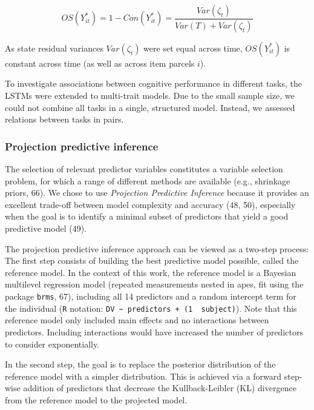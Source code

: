 \documentclass[
  man,floatsintext]{apa6}
\begin{document}
\begin{equation}
OS(Y^*_{it})=1-Con(Y^*_{it}) = \frac{Var(\zeta_t)}{Var(T)+Var(\zeta_t)}
\end{equation}

As state residual variances \(Var(\zeta_t)\) were set equal across time, \(OS(Y^*_{it})\) is constant across time (as well as across item parcels \(i\)).

To investigate associations between cognitive performance in different tasks, the LSTMs were extended to multi-trait models. Due to the small sample size, we could not combine all tasks in a single, structured model. Instead, we assessed relations between tasks in pairs.

\hypertarget{projection-predictive-inference}{%
\subsubsection{Projection predictive inference}\label{projection-predictive-inference}}

The selection of relevant predictor variables constitutes a variable selection problem, for which a range of different methods are available (e.g., shrinkage priors, 66). We chose to use \emph{Projection Predictive Inference} because it provides an excellent trade-off between model complexity and accuracy (48, 50), especially when the goal is to identify a minimal subset of predictors that yield a good predictive model (49).

The projection predictive inference approach can be viewed as a two-step process: The first step consists of building the best predictive model possible, called the reference model. In the context of this work, the reference model is a Bayesian multilevel regression model (repeated measurements nested in apes, fit using the package \texttt{brms}, 67), including all 14 predictors and a random intercept term for the individual (\texttt{R} notation: \texttt{DV\ \textasciitilde{}\ predictors\ +\ (1\ \textbar{}\ subject)}). Note that this reference model only included main effects and no interactions between predictors. Including interactions would have increased the number of predictors to consider exponentially.

In the second step, the goal is to replace the posterior distribution of the reference model with a simpler distribution. This is achieved via a forward step-wise addition of predictors that decrease the Kullback-Leibler (KL) divergence from the reference model to the projected model.
\end{document}
